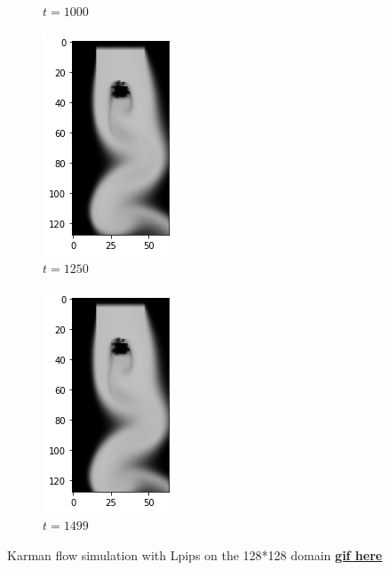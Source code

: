 \documentclass[a4paper,12pt,twoside]{report}
\begin{document}
\begin{figure}
\begin{subfigure}{0.18\textwidth}
		\caption{$t=1000$}
	\end{subfigure}
	\begin{subfigure}{0.18\textwidth}
		\centering
		\includegraphics[scale=0.5]{karmanflow/lpips_density_001250.png}
		\caption{$t=1250$}
	\end{subfigure}
	\begin{subfigure}{0.18\textwidth}
		\centering
		\includegraphics[scale=0.5]{karmanflow/lpips_density_001499.png}
		\caption{$t=1499$}
	\end{subfigure}
	\caption{Karman flow simulation with Lpips on the 128*128 domain \href{https://github.com/w191444052/sol-data/blob/master/karman_high/lpips.gif}{\bf{gif here}}}
	\label{sol karman high lpips}
\end{figure}
\end{document}
